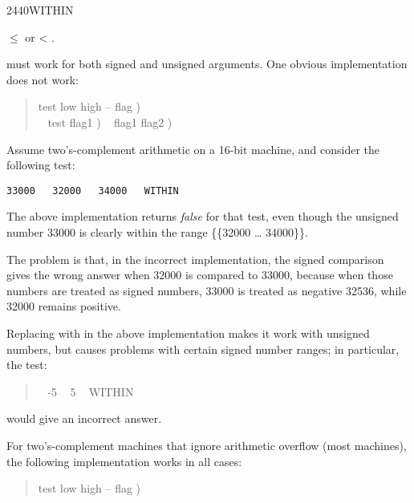 \begin{worddef}{2440}{WITHIN}
\begin{defer}
\begin{center}
			 $\le$  or  < .
		\end{center}
		 must work for both signed and unsigned arguments.
		One obvious implementation does not work:
		\begin{quote}\ttfamily
			\word{:}   test low high -- flag ) \\
			\tab {} ~     test flag1 )
				~     flag1 flag2 )
				 \\
			\word{;}
		\end{quote}
		Assume two's-complement arithmetic on a 16-bit machine, and
		consider the following test:

		\tab \texttt{33000 ~ 32000 ~ 34000 ~ WITHIN}

		The above implementation returns \emph{false} for that test,
		even though the unsigned number 33000 is clearly within the
		range \{\{32000 {\ldots} 34000\}\}.

		The problem is that, in the incorrect implementation, the
		signed comparison  gives the wrong answer when 32000
		is compared to 33000, because when those numbers are treated
		as signed numbers, 33000 is treated as negative 32536, while
		32000 remains positive.

		Replacing  with  in the above implementation
		makes it work with unsigned numbers, but causes problems with
		certain signed number ranges; in particular, the test:
		\begin{quote} ~ -5 ~ 5 ~ WITHIN
		\end{quote}
		would give an incorrect answer.

		For two's-complement machines that ignore arithmetic overflow
		(most machines), the following implementation works in all
		cases:
		\begin{quote}\ttfamily
			\word{:}   test low high -- flag )	~
				 \word{-}  \word{-}   ~
			\word{;}
		\end{quote}
	\end{defer}
\end{worddef}


